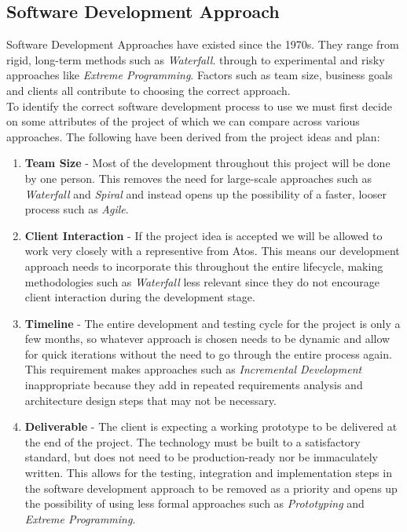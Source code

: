 \subsection{Software Development Approach}
Software Development Approaches have existed since the 1970s. They range from rigid, long-term methods such as \emph{Waterfall}. through to experimental and risky approaches like \emph{Extreme Programming}. Factors such as team size, business goals and clients all contribute to choosing the correct approach.\\
To identify the correct software development process to use we must first decide on some attributes of the project of which we can compare across various approaches. The following have been derived from the project ideas and plan:

\begin{enumerate}
  \item \textbf{Team Size} -
    Most of the development throughout this project will be done by one person. This removes the need for large-scale approaches such as \emph{Waterfall} and \emph{Spiral} and instead opens up the possibility of a faster, looser process such as \emph{Agile}.
  \item \textbf{Client Interaction} - 
    If the project idea is accepted we will be allowed to work very closely with a representive from Atos. This means our development approach needs to incorporate this throughout the entire lifecycle, making methodologies such as \emph{Waterfall} less relevant since they do not encourage client interaction during the development stage.
  \item \textbf{Timeline} - 
    The entire development and testing cycle for the project is only a few months, so whatever approach is chosen needs to be dynamic and allow for quick iterations without the need to go through the entire process again. This requirement makes approaches such as \emph{Incremental Development} inappropriate because they add in repeated requirements analysis and architecture design steps that may not be necessary.
  \item \textbf{Deliverable} -
    The client is expecting a working prototype to be delivered at the end of the project. The technology must be built to a satisfactory standard, but does not need to be production-ready nor be immaculately written. This allows for the testing, integration and implementation steps in the software development approach to be removed as a priority and opens up the possibility of using less formal approaches such as \emph{Prototyping} and \emph{Extreme Programming}.
\end{enumerate}

